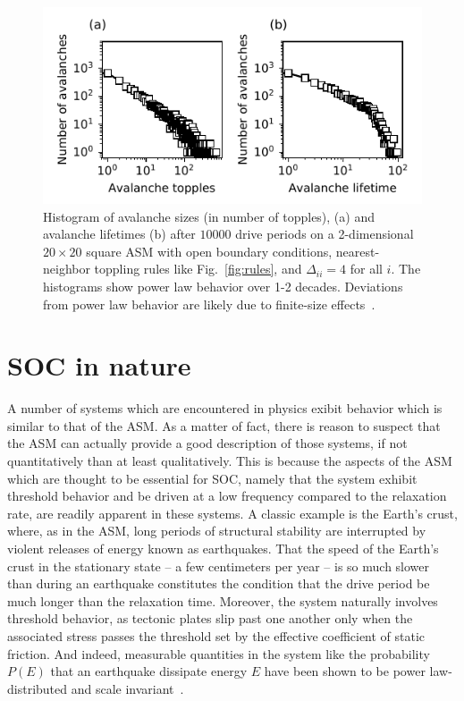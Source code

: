 \documentclass[aps,prb,reprint,superscriptaddress]{revtex4-2}
\begin{document}
\begin{figure}
\includegraphics{avalanches}
\caption{\label{fig:avalanches}Histogram of avalanche sizes (in number of topples), (a) and avalanche lifetimes (b) after $10000$ drive periods on a 2-dimensional $20 \times 20$ square ASM with open boundary conditions, nearest-neighbor toppling rules like Fig.~\ref{fig:rules}, and $\Delta_{ii} = 4$ for all $i$. The histograms show power law behavior over 1-2 decades. Deviations from power law behavior are likely due to finite-size effects~\cite{jensen}.}
\end{figure}

\section{SOC in nature}

A number of systems which are encountered in physics exibit behavior which is similar to that of the ASM. As a matter of fact, there is reason to suspect that the ASM can actually provide a good description of those systems, if not quantitatively than at least qualitatively. This is because the aspects of the ASM which are thought to be essential for SOC, namely that the system exhibit threshold behavior and be driven at a low frequency compared to the relaxation rate, are readily apparent in these systems. A classic example is the Earth's crust, where, as in the ASM, long periods of structural stability are interrupted by violent releases of energy known as earthquakes. That the speed of the Earth's crust in the stationary state -- a few centimeters per year -- is so much slower than during an earthquake constitutes the condition that the drive period be much longer than the relaxation time. Moreover, the system naturally involves threshold behavior, as tectonic plates slip past one another only when the associated stress passes the threshold set by the effective coefficient of static friction. And indeed, measurable quantities in the system like the probability $P(E)$ that an earthquake dissipate energy $E$ have been shown to be power law-distributed and scale invariant~\cite{jensen}.
\end{document}
